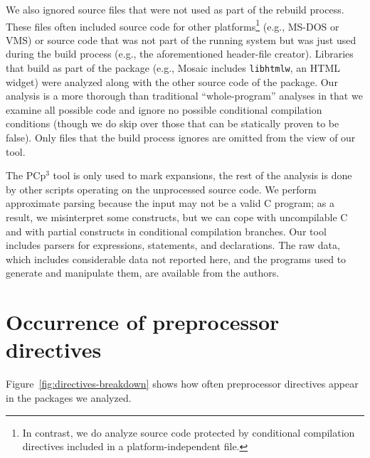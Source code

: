 \documentclass[10pt]{article}
\newcommand{\pcp}{\mbox{\textsf{PCp}$^3$}}
\begin{document}
We also ignored source files that were not used as part of the rebuild
process.  These files often included source code for other
platforms\footnote{In contrast, we do analyze source code protected by
  conditional compilation directives included in a platform-independent
  file.} (e.g., MS-DOS or VMS) or source code that was not part of the running
system but was just used during the build process (e.g., the
aforementioned header-file creator).  Libraries that build as part of
the package (e.g., Mosaic includes \texttt{libhtmlw}, an HTML widget)
were analyzed along with the other source code of the package.  Our
analysis is a more thorough than traditional ``whole-program'' analyses
in that we examine all possible code and ignore no possible conditional
compilation conditions (though we do skip over those that can be
statically proven to be false).  Only files that the build process
ignores are omitted from the view of our tool.



The \pcp{} tool is only used to mark expansions, the rest of the
analysis is done by other scripts operating on the unprocessed source
code.  We perform approximate parsing because the input may not be a
valid C program; as a result, we misinterpret some constructs, but we
can cope with uncompilable C and with partial constructs in conditional
compilation branches.  Our tool includes parsers for expressions,
statements, and declarations.  The raw data, which includes considerable
data not reported here, and the programs used to generate and manipulate
them, are available from the authors.


\section{Occurrence of preprocessor directives}
\label{sec:directives}
\label{sec:first-content-section}

Figure~\ref{fig:directives-breakdown} shows how often preprocessor
directives appear in the packages we analyzed.
\end{document}
